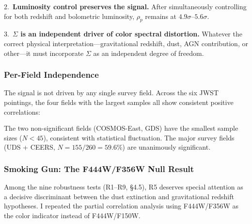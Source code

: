\documentclass[apj,twocolumn,longbibliography,linenumbers]{aastex701}
\begin{document}
2.~\textbf{Luminosity control preserves the signal.} After simultaneously controlling for both redshift and bolometric luminosity, $\rho_p$ remains at $4.9\sigma$--$5.6\sigma$.

3.~\textbf{$\Sigma$ is an independent driver of color spectral distortion.} Whatever the correct physical interpretation---gravitational redshift, dust, AGN contribution, or other---it must incorporate $\Sigma$ as an independent degree of freedom.

\subsubsection{Per-Field Independence}

The signal is not driven by any single survey field. Across the six JWST pointings, the four fields with the largest samples all show consistent positive correlations:

\begin{table}[h]
\caption{Per-Field Color--$\Sigma$ Correlation}
\label{tab:per_field}
\centering
\small
{}
\end{table}

The two non-significant fields (COSMOS-East, GDS) have the smallest sample sizes ($N < 45$), consistent with statistical fluctuation. The major survey fields (UDS + CEERS, $N = 155/260 = 59.6\%$) are unanimously significant.

\subsubsection{Smoking Gun: The F444W/F356W Null Result}

Among the nine robustness tests (R1--R9, \S4.5), R5 deserves special attention as a decisive discriminant between the dust extinction and gravitational redshift hypotheses. I repeated the partial correlation analysis using F444W/F356W as the color indicator instead of F444W/F150W.
\end{document}
